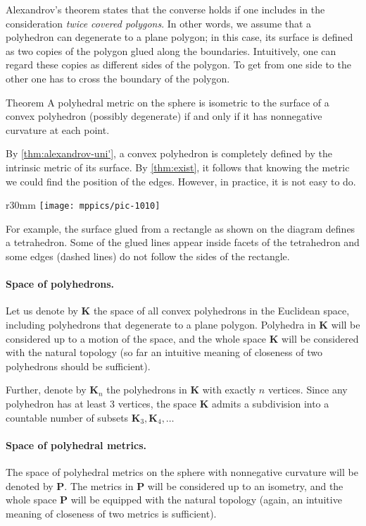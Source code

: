 Alexandrov's theorem states that the converse holds if one includes in the consideration \emph{twice covered polygons}.
In other words, we assume that a polyhedron can degenerate to a plane polygon;
in this case, its surface is defined as two copies of the polygon glued along the boundaries.
Intuitively, one can regard these copies as different sides of the polygon.
To get from one side to the other one has to cross the boundary of the polygon.

\begin{thm}{Theorem}\label{thm:exist}
A polyhedral metric on the sphere is isometric to the surface of a convex polyhedron (possibly degenerate) if and only if it has nonnegative curvature at each point.
\end{thm}

By \ref{thm:alexandrov-uni'}, a convex polyhedron is completely defined by the intrinsic metric of its surface.
By \ref{thm:exist}, it follows that knowing the metric we could find the position of the edges.
However, in practice, it is not easy to do.

\begin{wrapfigure}{r}{30mm}
\vskip-0mm
\centering
\texttt{[image: mppics/pic-1010]}
\vskip-0mm
\end{wrapfigure}

For example, the surface glued from a rectangle as shown on the diagram defines a tetrahedron.
Some of the glued lines appear inside facets of the tetrahedron and some edges (dashed lines) do not follow the sides of the rectangle.

\paragraph{Space of polyhedrons.}
Let us denote by $\mathbf{K}$ the space of all convex polyhedrons in the Euclidean space,
including polyhedrons that degenerate to a plane polygon.
Polyhedra in $\mathbf{K}$ will be considered up to a motion of the space, 
and the whole space $\mathbf{K}$ will be considered with the natural topology (so far an intuitive meaning of closeness of two polyhedrons should be sufficient). 

Further, denote by $\mathbf{K}_n$ the polyhedrons in $\mathbf{K}$ with exactly $n$ vertices.
Since any polyhedron has at least 3 vertices, the space $\mathbf{K}$ admits a subdivision into a countable number of subsets $\mathbf{K}_3,\mathbf{K}_4,\dots$

\paragraph{Space of polyhedral metrics.}
The space of polyhedral metrics on the sphere with nonnegative curvature will be denoted by $\mathbf{P}$.
The metrics in $\mathbf{P}$ will be considered up to an isometry, and the whole space $\mathbf{P}$ will be equipped with the natural topology (again, an intuitive meaning of closeness of two metrics is sufficient).

